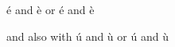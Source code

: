 \documentclass{article}
\begin{document}
é and è or \'e and \`e

and also with ú and ù or \'u and \`u
\end{document}
